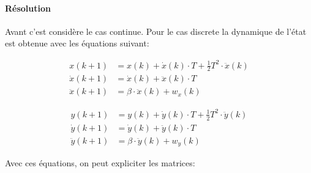 \documentclass{article}
\begin{document}
\paragraph{Résolution}Avant c'est considère le cas continue. Pour le cas discrete la dynamique de l'état est obtenue avec les équations suivant:
\begin{center}
    \begin{minipage}{0.45\textwidth}
        \begin{align*}
            x(k+1)        &= x(k) + \dot{x}(k) \cdot T + \frac{1}{2}T^2 \cdot \ddot{x}(k)\\
            \dot{x}(k+1)  &= \dot{x}(k) + \ddot{x}(k) \cdot T\\
            \ddot{x}(k+1) &= \beta \cdot \ddot{x}(k) + w_{x}(k)
        \end{align*}
    \end{minipage}
    \begin{minipage}{0.45\textwidth}
        \begin{align*}
            y(k+1)        &= y(k) + \dot{y}(k) \cdot T + \frac{1}{2}T^2 \cdot \ddot{y}(k)\\
            \dot{y}(k+1)  &= \dot{y}(k) + \ddot{y}(k) \cdot T\\
            \ddot{y}(k+1) &= \beta \cdot \ddot{y}(k) + w_{y}(k)
        \end{align*}
    \end{minipage}
\end{center}
Avec ces équations, on peut expliciter les matrices:
\end{document}
